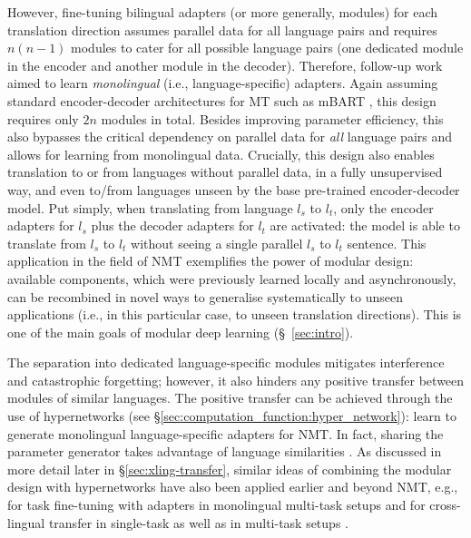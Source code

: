 However, 
fine-tuning bilingual adapters (or more generally, modules) for each translation direction assumes parallel data for all language pairs and requires $n(n-1)$ modules to cater for all possible language pairs (one dedicated module in the encoder and another module in the decoder). Therefore, follow-up work \citep{philip-etal-2020-monolingual,ustun-etal-2021-multilingual} aimed to learn \textit{monolingual} (i.e., language-specific) adapters. Again assuming standard encoder-decoder architectures for MT such as mBART \citep{liu-etal-2020-multilingual-denoising}, this design requires only $2n$ modules in total. Besides improving parameter efficiency, this also bypasses the critical dependency on parallel data for \textit{all} language pairs and allows for learning from monolingual data. Crucially, this design also enables translation to or from languages without parallel data, in a fully unsupervised way, and even to/from languages unseen by the base pre-trained encoder-decoder model. Put simply, when translating from language $l_{s}$ to $l_{t}$, only the encoder adapters for $l_{s}$ plus the decoder adapters for $l_{t}$ are activated: the model is able to translate from $l_{s}$ to $l_{t}$ without seeing a single parallel $l_{s}$ to $l_{t}$ sentence. This application in the field of NMT exemplifies the power of modular design: available components, which were previously learned locally and asynchronously, can be recombined in novel ways to generalise systematically to unseen applications (i.e., in this particular case, to unseen translation directions). This is one of the main goals of modular deep learning (\S~\ref{sec:intro}). 

The separation into dedicated language-specific modules mitigates interference and catastrophic forgetting; however, it also hinders any positive transfer between modules of similar languages. The positive transfer can be achieved through the use of hypernetworks (see \S\ref{sec:computation_function:hyper_network}): \cite{Baziotis2022MultilingualMTHyperAdapter} learn to generate monolingual language-specific adapters for NMT. In fact, sharing the parameter generator takes advantage of language similarities \citep{platanios-etal-2018-contextual}. As discussed in more detail later in \S\ref{sec:xling-transfer}, similar ideas of combining the modular design with hypernetworks have also been applied earlier and beyond NMT, e.g., for task fine-tuning with adapters in monolingual multi-task setups \citep{mahabadi2021parameter} and for cross-lingual transfer in single-task \citep{Ansell2021MADG} as well as in multi-task setups \citep{ponti-etal-2021-parameter,Ustun:2022hyperx}. 

